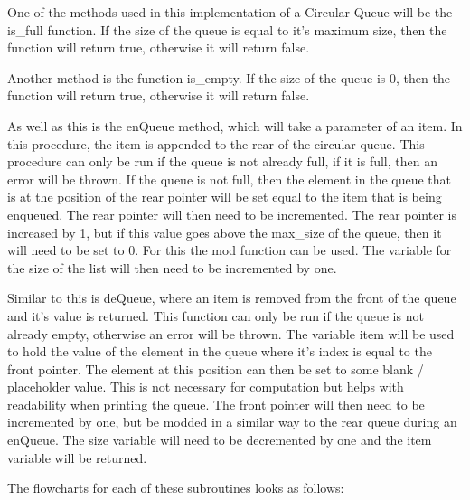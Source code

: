 \documentclass{article}
\begin{document}
One of the methods used in this implementation of a Circular Queue will be the is\_full function. If the size of the queue is equal to it's maximum size, then the function will return true, otherwise it will return false.

Another method is the function is\_empty. If the size of the queue is 0, then the function will return true, otherwise it will return false.

As well as this is the enQueue method, which will take a parameter of an item. In this procedure, the item is appended to the rear of the circular queue. This procedure can only be run if the queue is not already full, if it is full, then an error will be thrown. If the queue is not full, then the element in the queue that is at the position of the rear pointer will be set equal to the item that is being enqueued. The rear pointer will then need to be incremented. The rear pointer is increased by 1, but if this value goes above the max\_size of the queue, then it will need to be set to 0. For this the mod function can be used. The variable for the size of the list will then need to be incremented by one.

Similar to this is deQueue, where an item is removed from the front of the queue and it's value is returned. This function can only be run if the queue is not already empty, otherwise an error will be thrown. The variable item will be used to hold the value of the element in the queue where it's index is equal to the front pointer. The element at this position can then be set to some blank / placeholder value. This is not necessary for computation but helps with readability when printing the queue. The front pointer will then need to be incremented by one, but be modded in a similar way to the rear queue during an enQueue. The size variable will need to be decremented by one and the item variable will be returned.

The flowcharts for each of these subroutines looks as follows:
\end{document}
